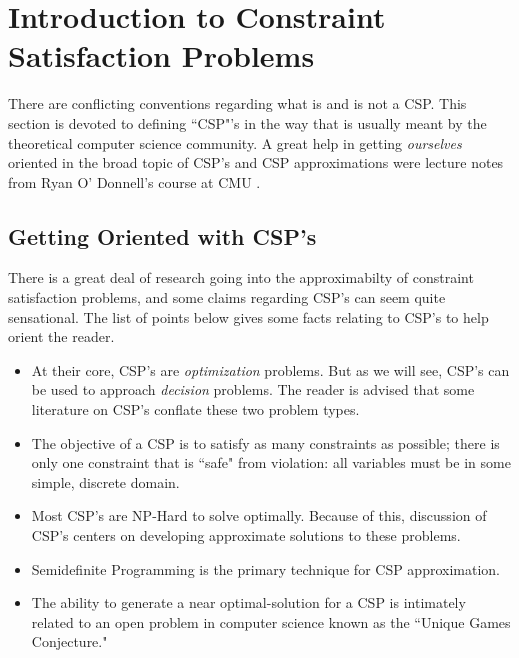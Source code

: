 %


\section{Introduction to Constraint Satisfaction Problems}\label{sec:introToCSP}
There are conflicting conventions regarding what is and is not a CSP. This section is devoted to defining ``CSP"'s in the way that is usually meant by the theoretical computer science community. A great help in getting {\it ourselves} oriented in the broad topic of CSP's and CSP approximations were lecture notes from Ryan O' Donnell's course at CMU \cite{Ryan}.
\subsection{Getting Oriented with CSP's}

There is a great deal of research going into the approximabilty of constraint satisfaction problems, and some claims regarding CSP's can seem quite sensational. 
The list of points below gives some facts relating to CSP's to help orient the reader.

\begin{itemize}
\item At their core, CSP's are \textit{optimization} problems. But as we will see, CSP's can be used to approach \textit{decision} problems. The reader is advised that some literature on CSP's conflate these two problem types.
\item The objective of a CSP is to satisfy as many constraints as possible; there is only one constraint that is ``safe" from violation: all variables must be in some simple, discrete domain.
\item Most CSP's are NP-Hard to solve optimally. Because of this, discussion of CSP's centers on developing approximate solutions to these problems.
\item Semidefinite Programming is the primary technique for CSP approximation.
\item The ability to generate a near optimal-solution for a CSP is intimately related to an open problem in computer science known as the ``Unique Games Conjecture."
\end{itemize}

